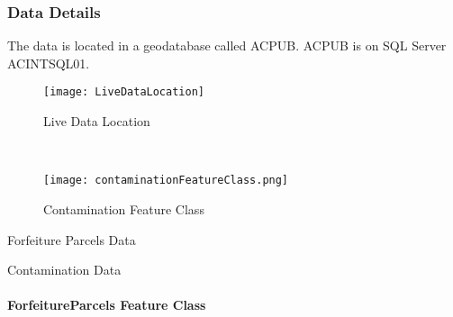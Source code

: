 \documentclass[class=book , crop=false, titlepage, twoside, multi={itemize, figure, verbatim}, float=false]{standalone}
\begin{document}
\subsubsection[Data Details]{Data Details\texorpdfstring{\\}{}}
%
\noindent The data is located in a geodatabase called ACPUB.  ACPUB is on SQL Server ACINTSQL01.
%
\begin{wrapfigure}{r}{0.6\textwidth}
\centering
\texttt{[image: LiveDataLocation]}
\caption{Live Data Location}
\vspace{.1in}

\HRule \\[.4cm] %
\vspace{.1in}

\texttt{[image: contaminationFeatureClass.png]}
\caption{Contamination Feature Class}
\end{wrapfigure}
%
\vspace{1in}

Forfeiture Parcels Data
\vspace{3in}

Contamination Data
\clearpage
%
%
%
\paragraph{ForfeitureParcels Feature Class}
\vspace{.5in}
\end{document}
